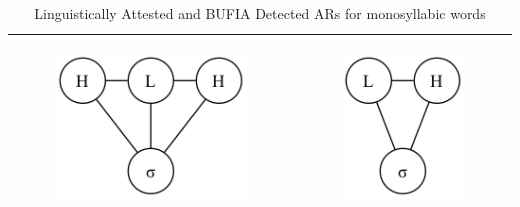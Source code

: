 \documentclass[11pt,letterpaper]{article}
\begin{document}
\begin{table}[H]
\begin{tabular}{c|c}
\begin{subfigure}{0.2\columnwidth}
			\caption{}
			\label{cons1b}
		\end{subfigure}
		\begin{subfigure}{0.2\columnwidth}
			\includegraphics[width=\textwidth]{graph/HLH1}
			\caption{}
			\label{cons1c}
		\end{subfigure} &   
		\begin{subfigure}{0.13\columnwidth}
			\includegraphics[width=\textwidth]{hausacons/cons0}
			\caption{}
			\label{cons1d}
		\end{subfigure}  \\
		\hline
	\end{tabular}
	\caption{Linguistically Attested and BUFIA Detected ARs for monosyllabic words}
	\label{tab:monoarcons}
\end{table}
\end{document}

